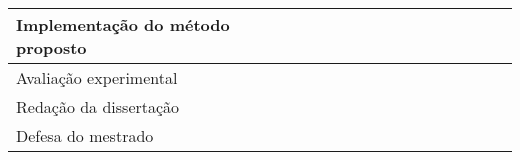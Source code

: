\begin{table}[!ht]
\begin{tabular}{|l|l|l|l|l|l|l|l|l|l|l|l|l|l|}
\hline
Implementação do método proposto         &                                       &                                       &                                       &                                       &                                       &                                       &                                       &                                       & {\cellcolor[rgb]{0.396,0.396,0.396}}  & {\cellcolor[rgb]{0.396,0.396,0.396}}  &                                       &                                       &                                        \\ 
\hline
Avaliação experimental                   &                                       &                                       &                                       &                                       &                                       &                                       &                                       &                                       &                                       & {\cellcolor[rgb]{0.396,0.396,0.396}}  & {\cellcolor[rgb]{0.396,0.396,0.396}}  &                                       &                                        \\ 
\hline
Redação da dissertação                   &                                       &                                       &                                       &                                       &                                       &                                       &                                       &                                       &                                       & {\cellcolor[rgb]{0.396,0.396,0.396}}  & {\cellcolor[rgb]{0.396,0.396,0.396}}  & {\cellcolor[rgb]{0.396,0.396,0.396}}  &                                        \\ 
\hline
Defesa do mestrado                       &                                       &                                       &                                       &                                       &                                       &                                       &                                       &                                       &                                       &                                       &                                       &                                       & {\cellcolor[rgb]{0.396,0.396,0.396}}   \\
\hline
\end{tabular}
\end{table}
